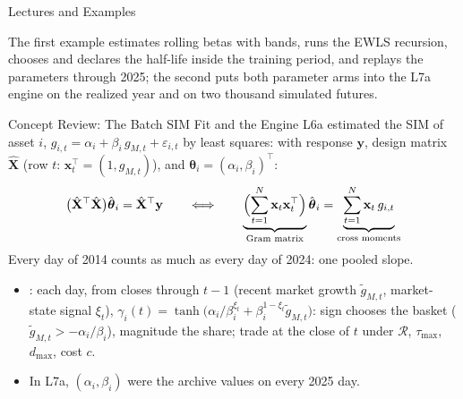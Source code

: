 \documentclass[aspectratio=169,11pt]{beamer}
\newcommand{\bx}{\mathbf{x}}
\newcommand{\by}{\mathbf{y}}
\newcommand{\bX}{\hat{\mathbf{X}}}
\newcommand{\bth}{\boldsymbol{\theta}}
\newcommand{\Rset}{\mathcal{R}}
\newcommand{\gt}{\tilde g_{M,t}}
\begin{document}
\begin{frame}{Lectures and Examples}
  \vspace{0.3em}
  {\normalsize\textbf{}\par
  }

  \vspace{0.6em}
  {\normalsize\textbf{}\par
  }

  \vspace{0.6em}
  {\normalsize\textbf{}\par
  }

  \vspace{0.5em}
  The first example estimates rolling betas with bands, runs the EWLS recursion,
  chooses and declares the half-life inside the training period, and replays the
  parameters through 2025; the second puts both parameter arms into the L7a
  engine on the realized year and on two thousand simulated futures.
\end{frame}

\begin{frame}{Concept Review: The Batch SIM Fit and the Engine}
  L6a estimated the SIM of asset $i$, $g_{i,t}=\alpha_i+\beta_i\,g_{M,t}+\varepsilon_{i,t}$
  by least squares: with response $\by$, design matrix $\bX$
  (row $t$: $\bx_t^{\top}=(1,g_{M,t})$), and $\bth_i=(\alpha_i,\beta_i)^{\top}$:
  \[
    \bigl(\bX^{\top}\bX\bigr)\hat{\bth}_i=\bX^{\top}\by
    \qquad\Longleftrightarrow\qquad
    \underbrace{\Bigl(\sum_{t=1}^{N}\bx_t\bx_t^{\top}\Bigr)}_{\text{Gram matrix}}\hat{\bth}_i
      =\underbrace{\sum_{t=1}^{N}\bx_t\,g_{i,t}}_{\text{cross moments}}
  \]
  Every day of 2014 counts as much as every day of 2024: one pooled slope.
  \begin{itemize}\setlength{\itemsep}{0.05em}
    \item {}: each day, from closes through $t-1$ (recent market
      growth $\gt$, market-state signal $\xi_t$),
      $\gamma_i(t)=\tanh\bigl(\alpha_i/\beta_i^{\xi_t}+\beta_i^{1-\xi_t}\gt\bigr)$: sign
      chooses the basket ($\gt>-\alpha_i/\beta_i$), magnitude the share; trade at
      the close of $t$ under $\Rset$, $\tau_{\max}$, $d_{\max}$, cost $c$.
    \item In L7a, $(\alpha_i,\beta_i)$ were the archive values on every 2025 day.
  \end{itemize}
\end{frame}
\end{document}
